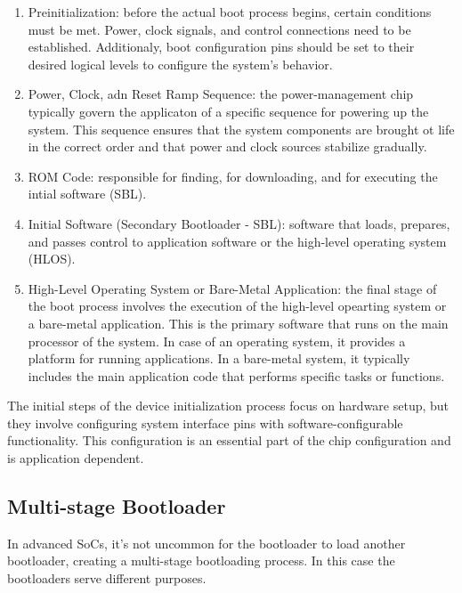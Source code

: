\begin{enumerate}
    \item   Preinitialization: before the actual boot process begins, certain
            conditions must be met. Power, clock signals, and control
            connections need to be established. Additionaly, boot configuration
            pins should be set to their desired logical levels to configure
            the system's behavior.
    \item   Power, Clock, adn Reset Ramp Sequence: the power-management chip
            typically govern the applicaton of a specific sequence for powering
            up the system. This sequence ensures that the system components are
            brought ot life in the correct order and that power and clock
            sources stabilize gradually.
    \item   ROM Code: responsible for finding, for downloading, and for
            executing the intial software (SBL).
    \item   Initial Software (Secondary Bootloader - SBL): software that loads,
            prepares, and passes control to application software or the
            high-level operating system (HLOS).
    \item   High-Level Operating System or Bare-Metal Application: the final
            stage of the boot process involves the execution of the high-level
            opearting system or a bare-metal application. This is the primary
            software that runs on the main processor of the system. In case of
            an operating system, it provides a platform for running
            applications. In a bare-metal system, it typically includes the
            main application code that performs specific tasks or functions.
\end{enumerate}

The initial steps of the device initialization process focus on hardware setup,
but they involve configuring system interface pins with software-configurable
functionality. This configuration is an essential part of the chip
configuration and is application dependent.

\subsection{Multi-stage Bootloader}

In advanced SoCs, it's not uncommon for the bootloader to load another
bootloader, creating a multi-stage bootloading process.
In this case the bootloaders serve different purposes.

